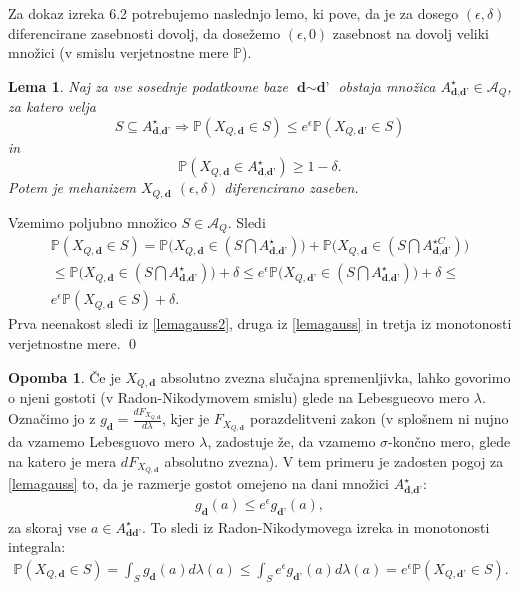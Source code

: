 \documentclass[12pt,a4paper]{amsart}
\theoremstyle{definition} %
\newtheorem{opomba}[definicija]{Opomba}
\theoremstyle{plain} %
\newtheorem{lema}[definicija]{Lema}
\begin{document}
Za dokaz izreka 6.2 potrebujemo naslednjo lemo, ki pove, da je za dosego $(\epsilon, \delta)$ diferencirane zasebnosti dovolj, da dosežemo $(\epsilon, 0)$ zasebnost na dovolj veliki množici (v smislu verjetnostne mere $\mathbb{P}$).
\begin{lema}
Naj za vse sosednje podatkovne baze $\textbf{d} \sim \textbf{d'}$ obstaja množica $A_{\textbf{d}, \textbf{d'}}^{\star} \in \mathcal{A}_Q$, za katero velja
\begin{equation}\label{lemagauss}
S \subseteq A_{\textbf{d}, \textbf{d'}}^{\star} \Rightarrow \mathbb{P}(X_{Q, \textbf{d}} \in S) \leq e^{\epsilon} \mathbb{P}(X_{Q, \textbf{d'}} \in S) \tag{8}
\end{equation}
in 
\begin{equation}\label{lemagauss2}
\mathbb{P}(X_{Q, \textbf{d}} \in A_{\textbf{d}, \textbf{d'}}^{\star}) \geq 1 - \delta. \tag{9}
\end{equation}
Potem je mehanizem $X_{Q, \textbf{d}}$ $(\epsilon, \delta)$ diferencirano zaseben.
\end{lema}
\proof 
Vzemimo poljubno množico $S \in \mathcal{A}_Q$. Sledi
\begin{gather*}
\mathbb{P}(X_{Q, \textbf{d}} \in S)  = \mathbb{P}\Big(X_{Q, \textbf{d}} \in (S \bigcap A_{\textbf{d}, \textbf{d'}}^{\star}) \Big)  + \mathbb{P}\Big(X_{Q, \textbf{d}} \in ( S \bigcap A_{\textbf{d}, \textbf{d'}}^{\star C} ) \Big) \\ \leq \mathbb{P}\Big(X_{Q, \textbf{d}} \in (S \bigcap A_{\textbf{d}, \textbf{d'}}^{\star}) \Big)  + \delta \leq e^{\epsilon} \mathbb{P}\Big(X_{Q, \textbf{d'}} \in (S \bigcap A_{\textbf{d}, \textbf{d'}}^{\star}) \Big)  + \delta \leq \\ e^{\epsilon} \mathbb{P}(X_{Q, \textbf{d}} \in S )  + \delta.
\end{gather*}
Prva neenakost sledi iz \eqref{lemagauss2}, druga iz \eqref{lemagauss} in tretja iz monotonosti verjetnostne mere.
\qed
\newline
\begin{opomba}
Če je $X_{Q, \textbf{d}}$ absolutno zvezna slučajna spremenljivka, lahko govorimo o njeni gostoti (v Radon-Nikodymovem smislu) glede na Lebesgueovo mero $\lambda$. Označimo jo z $g_{\textbf{d}} = \frac{dF_{X_{Q, \textbf{d}}}}{d \lambda}$, kjer je $F_{X_{Q, \textbf{d}}}$ porazdelitveni zakon (v splošnem ni nujno da vzamemo Lebesguovo mero $\lambda$, zadostuje že, da vzamemo $\sigma$-končno mero, glede na katero je mera $dF_{X_{Q, \textbf{d}}}$ absolutno zvezna). V tem primeru je zadosten pogoj za \eqref{lemagauss} to, da je razmerje gostot omejeno na dani množici $A_{\textbf{d}, \textbf{d'}}^{\star}$:
\begin{gather*}
  g_{\textbf{d}} (a) \leq e^{\epsilon} g_{\textbf{d'}} (a),
\end{gather*}
za skoraj vse $ a \in A_{\textbf{d}\textbf{d'}}^{\star}$.
To sledi iz Radon-Nikodymovega izreka in monotonosti integrala:
\begin{gather*}
\mathbb{P}(X_{Q, \textbf{d}} \in S) = \int_{S} g_{\textbf{d}}(a) d\lambda(a) \leq \int_{S} e^{\epsilon} g_{\textbf{d'}}(a) d\lambda(a) = e^{\epsilon} \mathbb{P}(X_{Q, \textbf{d'}} \in S).
\end{gather*}
\end{opomba}
\end{document}
